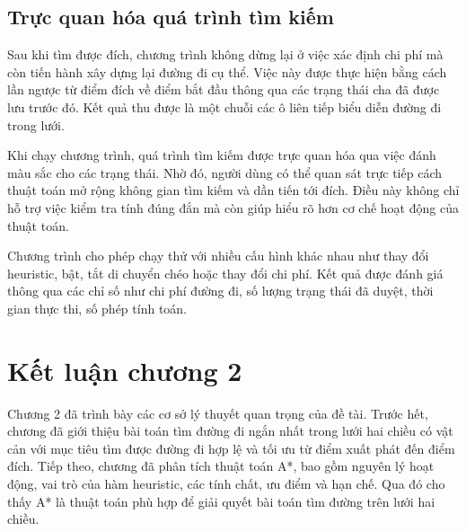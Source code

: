 \documentclass[12pt,a4paper]{report}
\begin{document}
\subsection{Trực quan hóa quá trình tìm kiếm}
Sau khi tìm được đích, chương trình không dừng lại ở việc xác định chi phí mà còn tiến hành xây dựng lại đường đi cụ thể. Việc này được thực hiện bằng cách lần ngược từ điểm đích về điểm bắt đầu thông qua các trạng thái cha đã được lưu trước đó. Kết quả thu được là một chuỗi các ô liên tiếp biểu diễn đường đi trong lưới.

\setlength{\parindent}{0pt}  
\setlength{\parskip}{6pt} 
Khi chạy chương trình, quá trình tìm kiếm được trực quan hóa qua việc đánh màu sắc cho các trạng thái. Nhờ đó, người dùng có thể quan sát trực tiếp cách thuật toán mở rộng không gian tìm kiếm và dần tiến tới đích. Điều này không chỉ hỗ trợ việc kiểm tra tính đúng đắn mà còn giúp hiểu rõ hơn cơ chế hoạt động của thuật toán.

\setlength{\parindent}{0pt}  
\setlength{\parskip}{6pt} 
Chương trình cho phép chạy thử với nhiều cấu hình khác nhau như thay đổi heuristic, bật, tắt di chuyển chéo hoặc thay đổi chi phí. Kết quả được đánh giá thông qua các chỉ số như chi phí đường đi, số lượng trạng thái đã duyệt, thời gian thực thi, số phép tính toán.

\section*{Kết luận chương 2}

Chương 2 đã trình bày các cơ sở lý thuyết quan trọng của đề tài. Trước hết, chương đã giới thiệu bài toán tìm đường đi ngắn nhất trong lưới hai chiều có vật cản với mục tiêu tìm được đường đi hợp lệ và tối ưu từ điểm xuất phát đến điểm đích.
Tiếp theo, chương đã phân tích thuật toán A*, bao gồm nguyên lý hoạt động, vai trò của hàm heuristic, các tính chất, ưu điểm và hạn chế. Qua đó cho thấy A* là thuật toán phù hợp để giải quyết bài toán tìm đường trên lưới hai chiều. 
\end{document}
